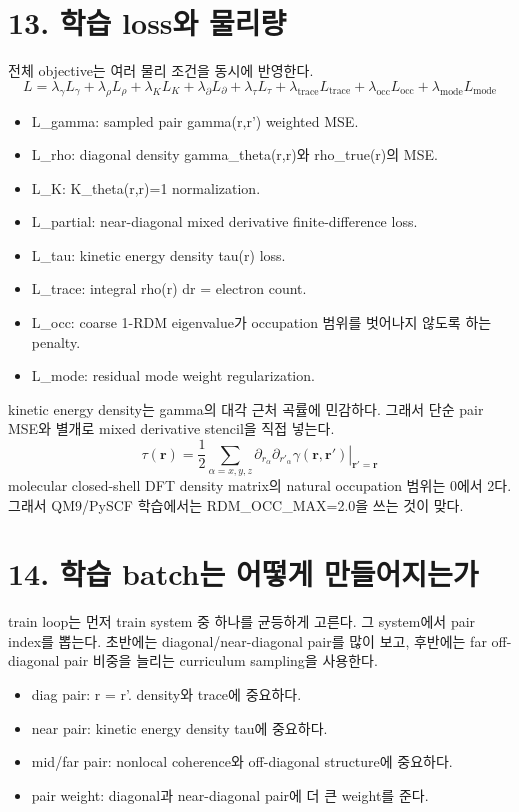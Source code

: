 \documentclass[11pt]{article}
\begin{document}
\section*{13. 학습 loss와 물리량}
전체 objective는 여러 물리 조건을 동시에 반영한다.
\[
L=\lambda_\gamma L_\gamma+\lambda_\rho L_\rho+\lambda_K L_K+\lambda_\partial L_\partial+\lambda_\tau L_\tau+\lambda_{\mathrm{trace}}L_{\mathrm{trace}}+\lambda_{\mathrm{occ}}L_{\mathrm{occ}}+\lambda_{\mathrm{mode}}L_{\mathrm{mode}}
\]
\begin{itemize}[leftmargin=1.5em]
\item L\_gamma: sampled pair gamma(r,r') weighted MSE.
\item L\_rho: diagonal density gamma\_theta(r,r)와 rho\_true(r)의 MSE.
\item L\_K: K\_theta(r,r)=1 normalization.
\item L\_partial: near-diagonal mixed derivative finite-difference loss.
\item L\_tau: kinetic energy density tau(r) loss.
\item L\_trace: integral rho(r) dr = electron count.
\item L\_occ: coarse 1-RDM eigenvalue가 occupation 범위를 벗어나지 않도록 하는 penalty.
\item L\_mode: residual mode weight regularization.
\end{itemize}
kinetic energy density는 gamma의 대각 근처 곡률에 민감하다. 그래서 단순 pair MSE와 별개로 mixed derivative stencil을 직접 넣는다.
\[
\tau(\mathbf{r})=\frac{1}{2}\sum_{\alpha=x,y,z}\left.\partial_{r_\alpha}\partial_{r'_\alpha}\gamma(\mathbf{r},\mathbf{r}')\right|_{\mathbf{r}'=\mathbf{r}}
\]
molecular closed-shell DFT density matrix의 natural occupation 범위는 0에서 2다. 그래서 QM9/PySCF 학습에서는 RDM\_OCC\_MAX=2.0을 쓰는 것이 맞다.
\section*{14. 학습 batch는 어떻게 만들어지는가}
train loop는 먼저 train system 중 하나를 균등하게 고른다. 그 system에서 pair index를 뽑는다. 초반에는 diagonal/near-diagonal pair를 많이 보고, 후반에는 far off-diagonal pair 비중을 늘리는 curriculum sampling을 사용한다.
\begin{itemize}[leftmargin=1.5em]
\item diag pair: r = r'. density와 trace에 중요하다.
\item near pair: kinetic energy density tau에 중요하다.
\item mid/far pair: nonlocal coherence와 off-diagonal structure에 중요하다.
\item pair weight: diagonal과 near-diagonal pair에 더 큰 weight를 준다.
\end{itemize}
\end{document}
